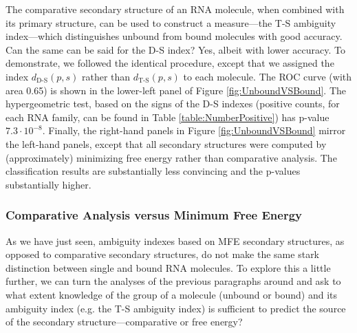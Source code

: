 \documentclass[10pt,letterpaper]{article}
\begin{document}
The comparative secondary structure of an RNA molecule, when combined with its primary structure, can be used to construct a measure---the T-S ambiguity index---which distinguishes unbound from bound molecules with good accuracy. Can the same can be said for the D-S index?
Yes, albeit with lower accuracy. To demonstrate, we followed the identical procedure, except that we assigned the index $d_\text{D-S}(p,s)$ rather than $d_\text{T-S}(p,s)$ to each molecule.  The ROC curve (with area 0.65) is shown in the lower-left panel of Figure \ref{fig:UnboundVSBound}. The hypergeometric test, based on the signs of the D-S indexes
(positive counts, for each RNA family, can be found in Table \ref{table:NumberPositive}) has p-value $7.3\cdot 10^{-8}$. Finally, the right-hand panels in Figure \ref{fig:UnboundVSBound} mirror the left-hand panels, except that all secondary structures were computed by (approximately) minimizing free energy rather than comparative analysis. The classification results are substantially less convincing and the p-values substantially higher.  

\subsubsection*{Comparative Analysis versus Minimum Free Energy}
As we have just seen, ambiguity indexes based on MFE secondary structures, as opposed to  comparative secondary structures, do not make the same stark 
distinction between single and bound RNA molecules. 
To explore this a little further, we can turn the analyses of the previous paragraphs around
and ask to what extent knowledge of the group of a molecule (unbound or bound) and its ambiguity index (e.g. the T-S ambiguity index) is sufficient to predict the source of the secondary structure---comparative or free energy? 
\end{document}

